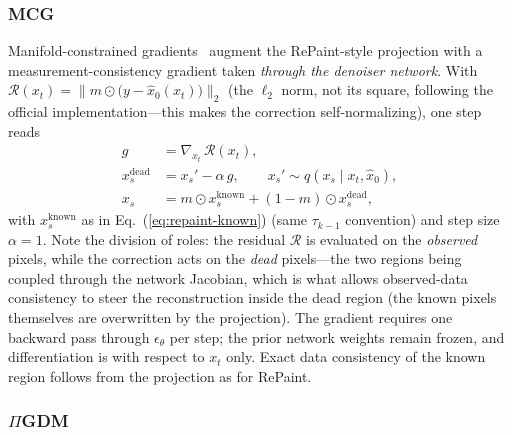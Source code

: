 \subsubsection{MCG}
\label{sec:inpainting:mcg}

Manifold-constrained gradients~\cite{chung2022mcg} augment the
RePaint-style projection with a measurement-consistency gradient taken
\emph{through the denoiser network}.  With
$\mathcal{R}(x_t) = \bigl\lVert m \odot \bigl(y - \hat x_0(x_t)\bigr)
\bigr\rVert_2$ (the $\ell_2$ norm, not its square, following the official
implementation---this makes the correction self-normalizing), one step
reads
\begin{align}
  g &= \nabla_{x_t}\, \mathcal{R}(x_t),\\
  x_s^{\mathrm{dead}} &= x_s' - \alpha\, g,
  \qquad x_s' \sim q(x_s \mid x_t, \hat x_0),\\
  x_s &= m \odot x_s^{\mathrm{known}} + (1-m) \odot x_s^{\mathrm{dead}},
\end{align}
with $x_s^{\mathrm{known}}$ as in Eq.~(\ref{eq:repaint-known}) (same
$\tau_{k-1}$ convention) and step size $\alpha = 1$.  Note the division
of roles: the residual $\mathcal{R}$ is evaluated on the \emph{observed}
pixels, while the correction acts on the \emph{dead} pixels---the two
regions being coupled through the network Jacobian, which is what allows
observed-data consistency to steer the reconstruction inside the dead
region (the known pixels themselves are overwritten by the projection).
The gradient requires one backward pass through $\epsilon_\theta$ per
step; the prior network weights remain frozen, and differentiation is
with respect to $x_t$ only.  Exact data consistency of the known region
follows from the projection as for RePaint.

\subsubsection{$\Pi$GDM}
\label{sec:inpainting:pigdm}

